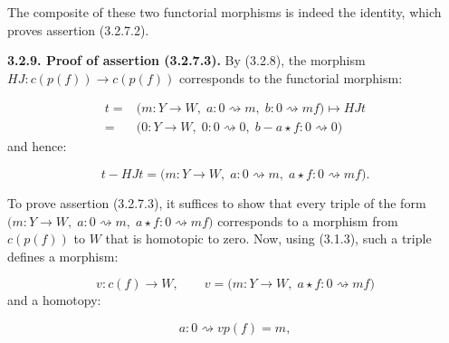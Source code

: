 The composite of these two functorial morphisms is indeed the identity,
which proves assertion (3.2.7.2).

\noindent\textbf{3.2.9. Proof of assertion (3.2.7.3).}\quad
{}
By (3.2.8), the morphism
$HJ\colon c(p(f))\longrightarrow c(p(f))$ corresponds to the functorial
morphism:

\begin{equation}
  \begin{aligned}
    t={}&\bigl(m\colon Y\longrightarrow W,\;
      a\colon0\rightsquigarrow m,\;
      b\colon0\rightsquigarrow mf\bigr)
      \longmapsto HJt\\
    ={}&\bigl(0\colon Y\longrightarrow W,\;
      0\colon0\rightsquigarrow0,\;
      b-a\star f\colon0\rightsquigarrow0\bigr)
  \end{aligned}
  \tag{3.2.9.1}
\end{equation}
and hence:

\begin{equation}
  t-HJt=\bigl(m\colon Y\longrightarrow W,\;
    a\colon0\rightsquigarrow m,\;
    a\star f\colon0\rightsquigarrow mf\bigr).
  \tag{3.2.9.2}
\end{equation}

To prove assertion (3.2.7.3), it suffices to show that every triple of the
form
$\bigl(m\colon Y\longrightarrow W,\;a\colon0\rightsquigarrow m,\;
a\star f\colon0\rightsquigarrow mf\bigr)$ corresponds to a morphism from
$c(p(f))$ to $W$ that is homotopic to zero. Now, using (3.1.3), such a
triple defines a morphism:

\begin{equation}
  v\colon c(f)\longrightarrow W,
  \qquad
  v=\bigl(m\colon Y\longrightarrow W,\;
    a\star f\colon0\rightsquigarrow mf\bigr)
  \tag{3.2.9.3}
\end{equation}
and a homotopy:

\begin{equation}
  a\colon0\rightsquigarrow vp(f)=m,
  \tag{3.2.9.4}
\end{equation}
